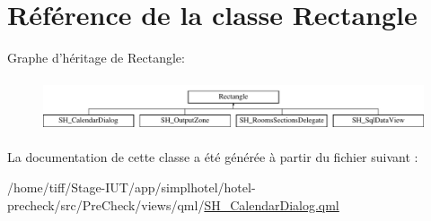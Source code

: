 \hypertarget{classRectangle}{\section{Référence de la classe Rectangle}
\label{classRectangle}
}
Graphe d'héritage de Rectangle\-:\begin{figure}[H]
\begin{center}
\leavevmode
\includegraphics[height=1.564246cm]{classRectangle}
\end{center}
\end{figure}


La documentation de cette classe a été générée à partir du fichier suivant \-:\begin{DoxyCompactItemize}
\item 
/home/tiff/\-Stage-\/\-I\-U\-T/app/simplhotel/hotel-\/precheck/src/\-Pre\-Check/views/qml/\hyperlink{SH__CalendarDialog_8qml}{S\-H\-\_\-\-Calendar\-Dialog.\-qml}\end{DoxyCompactItemize}
